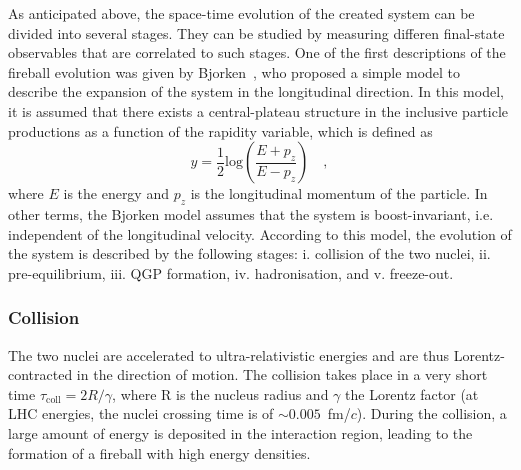 As anticipated above, the space-time evolution of the created system can be divided into several stages. They can be studied by measuring differen final-state observables that are correlated to such stages. One of the first descriptions of the fireball evolution was given by Bjorken~\cite{Bjorken:1982qr}, who proposed a simple model to describe the expansion of the system in the longitudinal direction. In this model, it is assumed that there exists a central-plateau structure in the inclusive particle productions as a function of the rapidity variable, which is defined as 
\begin{equation*}
    y = \frac{1}{2}\mathrm{log}\left(\frac{E+p_z}{E-p_z}\right)\quad ,
\end{equation*}
where $E$ is the energy and $p_z$ is the longitudinal momentum of the particle. In other terms, the Bjorken model assumes that the system is boost-invariant, i.e. independent of the longitudinal velocity. According to this model, the evolution of the system is described by the following stages: i. collision of the two nuclei, ii. pre-equilibrium, iii. QGP formation, iv. hadronisation, and v. freeze-out.

\subsubsection{Collision}
The two nuclei are accelerated to ultra-relativistic energies and are thus Lorentz-contracted in the direction of motion. The collision takes place in a very short time $\tau_\mathrm{coll} = 2R/\gamma$, where R is the nucleus radius and $\gamma$ the Lorentz factor (at LHC energies, the nuclei crossing time is of $\sim 0.005$~fm/$c$). During the collision, a large amount of energy is deposited in the interaction region, leading to the formation of a fireball with high energy densities.


